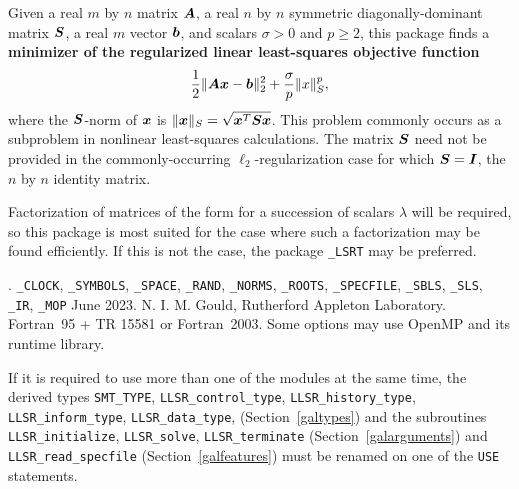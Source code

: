 \documentclass{galahad}
\newcommand{\packagename}{LLSR}
\newcommand{\fullpackagename}{\libraryname\_\packagename}
\begin{document}
\galheader


\galsummary
Given a real $m$ by $n$ matrix ${\bm{A}}$,
a real $n$ by $n$ symmetric diagonally-dominant matrix ${\bm{S}}$,
a real $m$ vector ${\bm{b}}$, and scalars $\sigma>0$ and $p \geq 2$, 
this package finds a
{\bf minimizer of the regularized linear least-squares objective function}
$$\frac{1}{2} \| {\bm{A}} {\bm{x}}  - {\bm{b}} \|^2_2 + \frac{\sigma}{p}\|x\|_S^p,$$
where the ${\bm{S}}$-norm of ${\bm{x}}$ is $\|{\bm{x}}\|_S = \sqrt{{\bm{x}}^T {\bm{S}} {\bm{x}}}$.
This problem commonly occurs as a subproblem in nonlinear
least-squares calculations.
The matrix ${\bm{S}}$ need not be provided in the commonly-occurring
$\ell_2$-regularization case for which ${\bm{S}} = {\bm{I}}$, the $n$ by $n$
identity matrix.

\noindent
Factorization of matrices of the form
for a succession
of scalars $\lambda$ will be required, so this package is most suited
for the case where such a factorization may be found efficiently. If
this is not the case, the package {\tt \libraryname\_LSRT} may be preferred.


\galattributes
\galversions{\tt  \fullpackagename\_single, \fullpackagename\_double}.
\galuses
{\tt \libraryname\_CLOCK},
{\tt \libraryname\_SY\-M\-BOLS},
{\tt \libraryname\_SPACE}, {\tt \libraryname\_\-RAND},
{\tt \libraryname\_\-NORMS},
{\tt \libraryname\_ROOTS}, {\tt \libraryname\_SPECFILE},
{\tt \libraryname\_SBLS},
{\tt \libraryname\_SLS}, {\tt \libraryname\_IR},
{\tt \libraryname\_MOP}
\galdate June 2023.
\galorigin N. I. M. Gould, Rutherford Appleton Laboratory.
\gallanguage Fortran~95 + TR 15581 or Fortran~2003.
\galparallelism Some options may use OpenMP and its runtime library.


\galhowto



\noindent
If it is required to use more than one of the modules at the same time, 
the derived types
{\tt SMT\_TYPE},
{\tt \packagename\_control\_type},
{\tt \packagename\_history\_\-type},
{\tt \packagename\_inform\_type},
{\tt \packagename\_data\_type},
(Section~\ref{galtypes})
and the subroutines
{\tt \packagename\_initialize},
{\tt \packagename\_solve}, {\tt \packagename\_\-terminate}
(Section~\ref{galarguments})
and
{\tt \packagename\_read\_specfile}
(Section~\ref{galfeatures})
must be renamed on one of the {\tt USE} statements.
\end{document}
